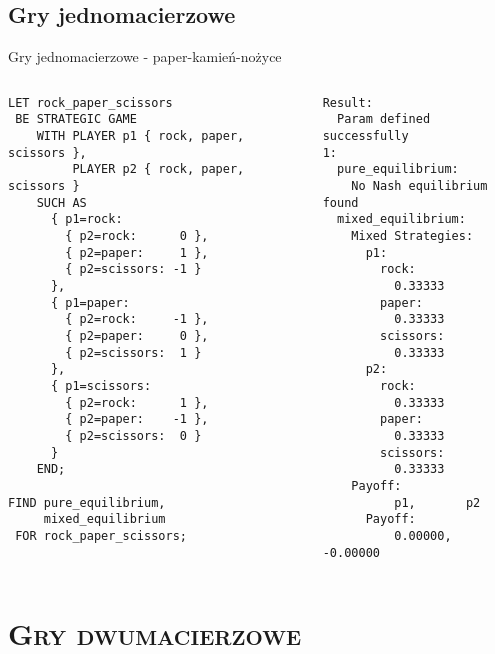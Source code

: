 \documentclass[xcolor=x11names,compress]{beamer}
\renewcommand{\(}{\begin{columns}}
\renewcommand{\)}{\end{columns}}
\newcommand{\<}[1]{\begin{column}{#1}}
\renewcommand{\>}{\end{column}}
\begin{document}
\subsection{Gry jednomacierzowe}
\begin{frame}[fragile]{Gry jednomacierzowe - paper-kamień-nożyce}
\begin{columns}[c]
\begin{column}{.5\textwidth}
\begin{lstlisting}
LET rock_paper_scissors
 BE STRATEGIC GAME
    WITH PLAYER p1 { rock, paper, scissors },
         PLAYER p2 { rock, paper, scissors }
    SUCH AS
      { p1=rock:
        { p2=rock:      0 },
        { p2=paper:     1 },
        { p2=scissors: -1 }
      },
      { p1=paper:
        { p2=rock:     -1 },
        { p2=paper:     0 },
        { p2=scissors:  1 }
      },
      { p1=scissors:
        { p2=rock:      1 },
        { p2=paper:    -1 },
        { p2=scissors:  0 }
      }
    END;

FIND pure_equilibrium,
     mixed_equilibrium
 FOR rock_paper_scissors;
\end{lstlisting}
\end{column}
\hspace{5pt}\vrule\hspace{5pt}
\begin{column}{.5\textwidth}
\begin{lstlisting}
Result:
  Param defined successfully
1:
  pure_equilibrium:
    No Nash equilibrium found
  mixed_equilibrium:
    Mixed Strategies:
      p1:
        rock:
          0.33333
        paper:
          0.33333
        scissors:
          0.33333
      p2:
        rock:
          0.33333
        paper:
          0.33333
        scissors:
          0.33333
    Payoff:
          p1,       p2
      Payoff:
          0.00000,  -0.00000
\end{lstlisting}
\end{column}
\end{columns}
\end{frame}


\section{\scshape Gry dwumacierzowe}
\end{document}
